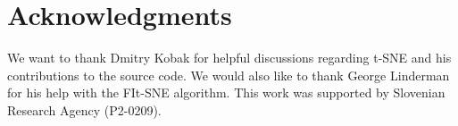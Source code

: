 \documentclass[article]{jss}
\begin{document}
\section*{Acknowledgments}

We want to thank Dmitry Kobak for helpful discussions regarding t-SNE and
his contributions to the source code. We would also like to thank George
Linderman for his help with the FIt-SNE algorithm. This work was supported by
Slovenian Research Agency (P2-0209).




\end{document}
